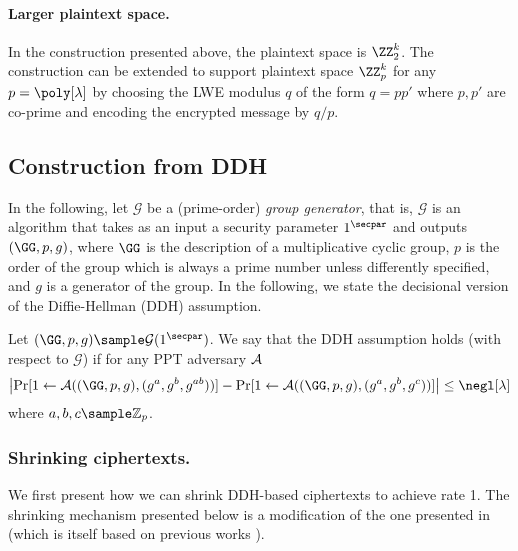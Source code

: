 \paragraph{Larger plaintext space.} In the construction presented above, the plaintext space is $\ZZ_2^k$. The construction can be extended to support plaintext space $\ZZ_p^k$  for any $p=\poly[\lambda]$ by choosing the LWE modulus $q$ of the form $q=pp'$ where $p,p'$ are co-prime and encoding the encrypted message by $q/p$.





\subsection{Construction from DDH}

In the following, let $\mathcal{G}$ be a (prime-order) \emph{group generator}, that is, $\mathcal{G}$ is an algorithm  that takes as an input a security parameter $1^\secpar$ and outputs $(\GG, p, g)$, where $\GG$ is the description of a multiplicative cyclic group, $p$ is the order of the group which is always a prime number unless differently specified, and $g$ is a generator of the group. In the following, we state the decisional version of the Diffie-Hellman (DDH) assumption.%



\begin{definition}
\label{def:ddh}
Let $(\GG, p, g) \sample \mathcal{G}(1^\secpar)$. We say that the DDH assumption holds (with respect to $\mathcal{G}$) if for any PPT adversary $\mathcal{A}$
 \[\left|\Pr[1\leftarrow\mathcal{A}((\GG, p , g), (g^a, g^b, g^{ab})) ] - \Pr[1\leftarrow\mathcal{A}((\GG, p , g), (g^{a}, g^{b}, g^{c}))]\right| \leq \negl[\lambda]\] where $a,b,c\sample \mathbb{Z}_p$.
\end{definition}


\subsubsection{Shrinking ciphertexts.} %

We first present how we can shrink DDH-based ciphertexts to achieve rate 1. The shrinking mechanism presented below is a modification of the one presented in \cite{TCC:BBDGM20} (which is itself based on previous works \cite{C:BoyGilIsh16,C:DGIMMO19}).

